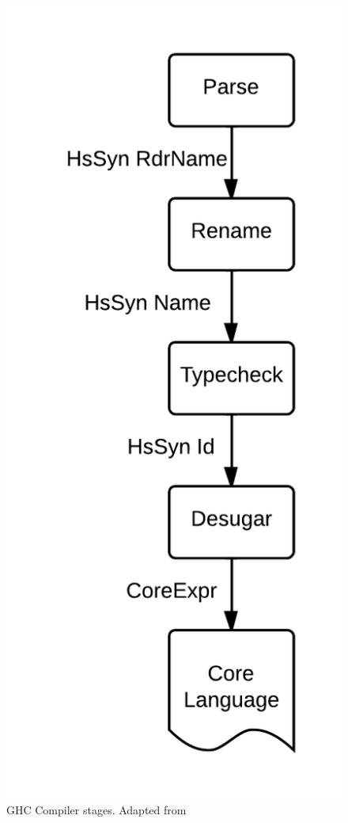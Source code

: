 \begin{figure}\label{compilerStages}
	\begin{center}
		\includegraphics[scale=.3]{images/compilerStages.png}
	\end{center}
	\caption{GHC Compiler stages. Adapted from \citep{ghcDesign}}
\end{figure}


